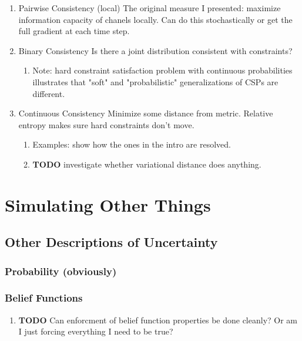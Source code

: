 \documentclass[11pt]{article}
\begin{document}
\begin{enumerate}
\item Pairwise Consistency (local)
\label{sec:org9e91757}
The original measure I presented: maximize information capacity of chanels locally. Can do this stochastically or get the full gradient at each time step.

\item Binary Consistency
\label{sec:org6ac07e9}
Is there a joint distribution consistent with constraints?

\begin{enumerate}
\item Note: hard constraint satisfaction problem with continuous probabilities illustrates that "soft" and "probabilistic" generalizations of CSPs are different.
\label{sec:org534d4d4}
\end{enumerate}

\item Continuous Consistency
\label{sec:orgea76b32}
Minimize some distance from metric. Relative entropy makes sure hard constraints don't move. 

\begin{enumerate}
\item Examples: show how the ones in the intro are resolved.
\label{sec:orgef89864}

\item {\bfseries\sffamily TODO} investigate whether variational distance does anything.
\label{sec:org69d2ce2}
\end{enumerate}
\end{enumerate}



\section{Simulating Other Things}
\label{sec:orgccdc494}
\subsection{Other Descriptions of Uncertainty}
\label{sec:orgff64b63}
\subsubsection{Probability (obviously)}
\label{sec:org94d0e30}
\subsubsection{Belief Functions}
\label{sec:orga1f5254}
\begin{enumerate}
\item {\bfseries\sffamily TODO} Can enforcment of belief function properties be done cleanly? Or am I just forcing everything I need to be true?
\label{sec:orgc39a807}
\end{enumerate}
\end{document}
